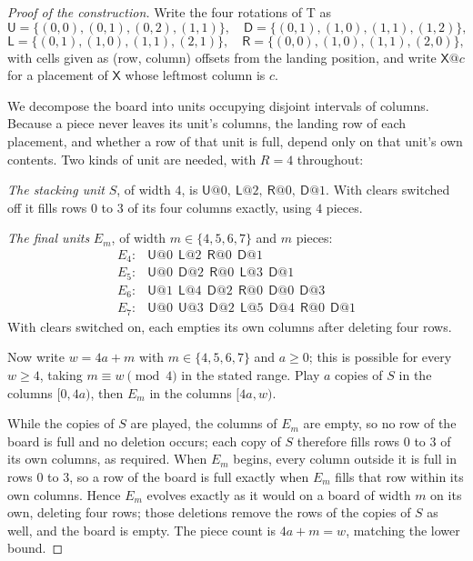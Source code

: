 \documentclass[11pt,a4paper]{article}
\theoremstyle{plain}
\theoremstyle{definition}
\theoremstyle{remark}
\begin{document}
\begin{proof}[Proof of the construction]
Write the four rotations of T as
\[
\mathsf{U} = \{(0,0),(0,1),(0,2),(1,1)\},\quad
\mathsf{D} = \{(0,1),(1,0),(1,1),(1,2)\},
\]
\[
\mathsf{L} = \{(0,1),(1,0),(1,1),(2,1)\},\quad
\mathsf{R} = \{(0,0),(1,0),(1,1),(2,0)\},
\]
with cells given as (row, column) offsets from the landing position, and write
$\mathsf{X}@c$ for a placement of $\mathsf{X}$ whose leftmost column is $c$.

We decompose the board into units occupying disjoint intervals of columns. Because a
piece never leaves its unit's columns, the landing row of each placement, and whether
a row of that unit is full, depend only on that unit's own contents. Two kinds of
unit are needed, with $R = 4$ throughout:

\smallskip
\noindent\emph{The stacking unit} $S$, of width $4$, is
$\mathsf{U}@0,\ \mathsf{L}@2,\ \mathsf{R}@0,\ \mathsf{D}@1$. With clears switched
off it fills rows $0$ to $3$ of its four columns exactly, using $4$ pieces.

\smallskip
\noindent\emph{The final units} $E_m$, of width $m \in \{4,5,6,7\}$ and $m$ pieces:
\[
\begin{array}{ll}
E_4: & \mathsf{U}@0\ \ \mathsf{L}@2\ \ \mathsf{R}@0\ \ \mathsf{D}@1 \\
E_5: & \mathsf{U}@0\ \ \mathsf{D}@2\ \ \mathsf{R}@0\ \ \mathsf{L}@3\ \ \mathsf{D}@1 \\
E_6: & \mathsf{U}@1\ \ \mathsf{L}@4\ \ \mathsf{D}@2\ \ \mathsf{R}@0\ \ \mathsf{D}@0\ \ \mathsf{D}@3 \\
E_7: & \mathsf{U}@0\ \ \mathsf{U}@3\ \ \mathsf{D}@2\ \ \mathsf{L}@5\ \ \mathsf{D}@4\ \ \mathsf{R}@0\ \ \mathsf{D}@1
\end{array}
\]
With clears switched on, each empties its own columns after deleting four rows.

Now write $w = 4a + m$ with $m \in \{4,5,6,7\}$ and $a \geq 0$; this is possible for
every $w \geq 4$, taking $m \equiv w \pmod 4$ in the stated range. Play $a$ copies of
$S$ in the columns $[0,4a)$, then $E_m$ in the columns $[4a,w)$.

While the copies of $S$ are played, the columns of $E_m$ are empty, so no row of the
board is full and no deletion occurs; each copy of $S$ therefore fills rows $0$ to
$3$ of its own columns, as required. When $E_m$ begins, every column outside it is
full in rows $0$ to $3$, so a row of the board is full exactly when $E_m$ fills that
row within its own columns. Hence $E_m$ evolves exactly as it would on a board of
width $m$ on its own, deleting four rows; those deletions remove the rows of the
copies of $S$ as well, and the board is empty. The piece count is $4a + m = w$,
matching the lower bound.
\end{proof}
\end{document}
